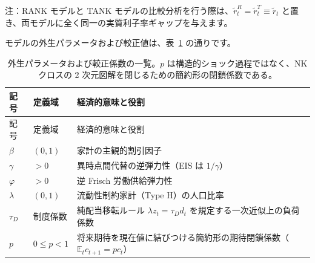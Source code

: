 \documentclass[
  japanese,
  lualatex,
  ja=standard,
  12pt,
  a4paper]{ltjsarticle}
\begin{document}
注：RANK モデルと TANK
モデルの比較分析を行う際は、\(\widetilde{r}_t^R = \widetilde{r}_t^T \equiv \widetilde{r}_t\)
と置き、両モデルに全く同一の実質利子率ギャップを与えます。

モデルの外生パラメータおよび較正値は、表~\ref{tbl-lecture12-parameters}
の通りです。

\begin{longtable}[]{@{}
  >{\raggedright\arraybackslash}p{}
  >{\raggedleft\arraybackslash}p{}
  >{\raggedright\arraybackslash}p{}@{}}
\caption{外生パラメータおよび較正係数の一覧。\(p\)
は構造的ショック過程ではなく、NKクロスの 2
次元図解を閉じるための簡約形の閉鎖係数である。}\label{tbl-lecture12-parameters}\tabularnewline
\toprule\noalign{}
\begin{minipage}[b]{\linewidth}\raggedright
記号
\end{minipage} & \begin{minipage}[b]{\linewidth}\raggedleft
定義域
\end{minipage} & \begin{minipage}[b]{\linewidth}\raggedright
経済的意味と役割
\end{minipage} \\
\midrule\noalign{}
\endfirsthead
\toprule\noalign{}
\begin{minipage}[b]{\linewidth}\raggedright
記号
\end{minipage} & \begin{minipage}[b]{\linewidth}\raggedleft
定義域
\end{minipage} & \begin{minipage}[b]{\linewidth}\raggedright
経済的意味と役割
\end{minipage} \\
\midrule\noalign{}
\endhead
\bottomrule\noalign{}
\endlastfoot
\(\beta\) & \((0, 1)\) & 家計の主観的割引因子 \\
\(\gamma\) & \(>0\) & 異時点間代替の逆弾力性（EIS は \(1/\gamma\)） \\
\(\varphi\) & \(>0\) & 逆 Frisch 労働供給弾力性 \\
\(\lambda\) & \((0, 1)\) & 流動性制約家計（Type H）の人口比率 \\
\(\tau_D\) & 制度係数 & 純配当移転ルール \(\lambda z_t = \tau_D d_t\)
を規定する一次近似上の負荷係数 \\
\(p\) & \(0 \leq p < 1\) &
将来期待を現在値に結びつける簡約形の期待閉鎖係数（\(\mathbb{E}_t c_{t+1} = p c_t\)） \\
\end{longtable}
\end{document}
